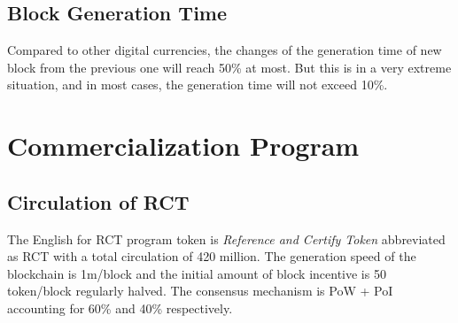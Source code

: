 \documentclass[a4paper,oneside,openany]{tufte-book}
\begin{document}
\section{Block Generation Time}
Compared to other digital currencies, the changes of the generation time of new block from the previous one will reach 50\% at most. But this is in a very extreme situation, and in most cases, the generation time will not exceed 10\%.





































\chapter{Commercialization Program}




\section{Circulation of RCT}


The English for RCT program token is \emph{Reference and Certify Token} abbreviated as RCT with a total circulation of 420 million. The generation speed of the blockchain is 1m/block and the initial amount of block incentive is 50 token/block regularly halved. The consensus mechanism is PoW + PoI accounting for 60\% and 40\% respectively.
\end{document}
